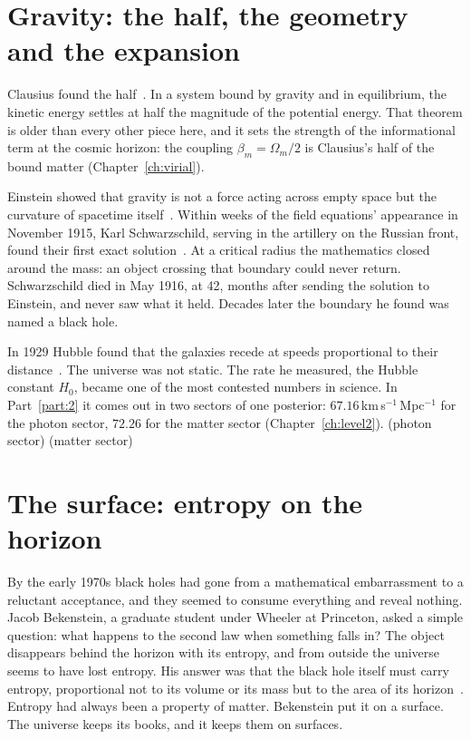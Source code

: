 \section*{Gravity: the half, the geometry and the expansion}

Clausius found the half~\cite{Clausius1870}. In a system bound by gravity and in equilibrium, the kinetic energy settles at half the
magnitude of the potential energy. \derived{} That theorem is older than every other piece here, and it sets the strength of the
informational term at the cosmic horizon: the coupling $\beta_m=\Omega_m/2$ is Clausius's half of the bound matter (Chapter~\ref{ch:virial}).

Einstein showed that gravity is not a force acting across empty space but the curvature of spacetime itself~\cite{Einstein1916}. Within
weeks of the field equations' appearance in November 1915, Karl Schwarzschild, serving in the artillery on the Russian front, found their
first exact solution~\cite{SchwarzschildGO}. At a critical radius the mathematics closed around the mass: an object crossing that boundary could never
return. Schwarzschild died in May 1916, at 42, months after sending the solution to Einstein, and never saw what it held. Decades later the
boundary he found was named a black hole.

In 1929 Hubble found that the galaxies recede at speeds proportional to their distance~\cite{Hubble1929}. \observed{} The universe was not
static. The rate he measured, the Hubble constant $H_0$, became one of the most contested numbers in science. In Part~\ref{part:2} it comes
out in two sectors of one posterior: $67.16$\,km\,s$^{-1}$\,Mpc$^{-1}$ for the photon sector, $72.26$ for the matter sector
(Chapter~\ref{ch:level2}). \measured{} (photon sector) \calc{} (matter sector)

\section*{The surface: entropy on the horizon}

By the early 1970s black holes had gone from a mathematical embarrassment to a reluctant acceptance, and they seemed to consume everything
and reveal nothing. Jacob Bekenstein, a graduate student under Wheeler at Princeton, asked a simple question: what happens to the second law
when something falls in? The object disappears behind the horizon with its entropy, and from outside the universe seems to have lost
entropy. His answer was that the black hole itself must carry entropy, proportional not to its volume or its mass but to the area of its
horizon~\cite{Bekenstein1973}. \derived{} Entropy had always been a property of matter. Bekenstein put it on a surface. The universe keeps
its books, and it keeps them on surfaces.

